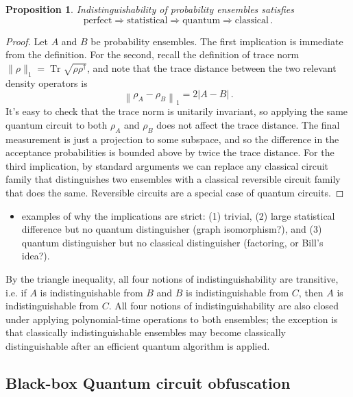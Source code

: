 \documentclass[11pt]{article}
\DeclareMathOperator{\tr}{Tr}
\numberwithin{equation}{section}
\newtheorem{proposition}{Proposition}
\begin{document}
\begin{proposition} Indistinguishability of probability ensembles satisfies
$$
\text{perfect} \Rightarrow \text{statistical} \Rightarrow \text{quantum} \Rightarrow \text{classical}\,.
$$
\end{proposition}
\begin{proof}
Let $A$ and $B$ be probability ensembles. The first implication is immediate from the definition. For the second, recall the definition of trace norm $\|\rho\|_1 = \tr \sqrt{\rho \rho^\dagger}$, and note that the trace distance between the two relevant density operators is
$$
\left\| \rho_A - \rho_B \right\|_1 = 2 |A - B|\,.
$$
It's easy to check that the trace norm is unitarily invariant, so applying the same quantum circuit to both $\rho_A$ and $\rho_B$ does not affect the trace distance. The final measurement is just a projection to some subspace, and so the difference in the acceptance probabilities is bounded above by twice the trace distance. For the third implication, by standard arguments we can replace any classical circuit family that distinguishes two ensembles with a classical reversible circuit family that does the same. Reversible circuits are a special case of quantum circuits.
\end{proof}

\begin{itemize}
\item examples of why the implications are strict: (1) trivial, (2) large statistical difference but no quantum distinguisher (graph isomorphism?), and (3) quantum distinguisher but no classical distinguisher (factoring, or Bill's idea?).
\end{itemize}

By the triangle inequality, all four notions of indistinguishability are transitive, i.e. if $A$ is indistinguishable from $B$ and $B$ is indistinguishable from $C$, then $A$ is indistinguishable from $C$.  All four notions of indistinguishability are also closed under applying polynomial-time operations to both ensembles; the exception is that classically indistinguishable ensembles may become classically distinguishable after an efficient quantum algorithm is applied. 



\subsection{Black-box Quantum circuit obfuscation}
\end{document}

